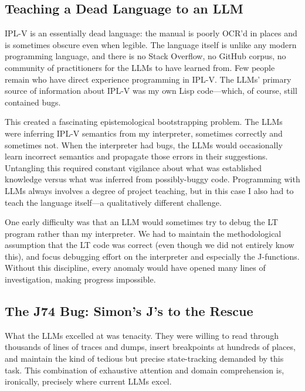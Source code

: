 \documentclass[journal]{IEEEtran}
\begin{document}
\subsection{Teaching a Dead Language to an LLM}

IPL-V is an essentially dead language: the manual is poorly OCR'd in
places and is sometimes obscure even when legible. The language itself
is unlike any modern programming language, and there is no Stack
Overflow, no GitHub corpus, no community of practitioners for the LLMs
to have learned from. Few people remain who have direct experience
programming in IPL-V.  The LLMs' primary source of information about
IPL-V was my own Lisp code---which, of course, still contained bugs.

This created a fascinating epistemological bootstrapping problem. The
LLMs were inferring IPL-V semantics from my interpreter, sometimes
correctly and sometimes not. When the interpreter had bugs, the LLMs
would occasionally learn incorrect semantics and propagate those
errors in their suggestions. Untangling this required constant
vigilance about what was established knowledge versus what was
inferred from possibly-buggy code. Programming with LLMs always
involves a degree of project teaching, but in this case I also had to
teach the language itself---a qualitatively different challenge.


One early difficulty was that an LLM would sometimes try to debug the
LT program rather than my interpreter. We had to maintain the
methodological assumption that the LT code was correct (even though we  
did not entirely know this), and focus debugging effort on the
interpreter and especially the J-functions. Without this discipline,
every anomaly would have opened many lines of investigation, making
progress impossible.

\subsection{The J74 Bug: Simon's J's to the Rescue}

What the LLMs excelled at was tenacity. They were willing to read
through thousands of lines of traces and dumps, insert breakpoints at
hundreds of places, and maintain the kind of tedious but precise
state-tracking demanded by this task. This combination of exhaustive
attention and domain comprehension is, ironically, precisely where
current LLMs excel.
\end{document}
